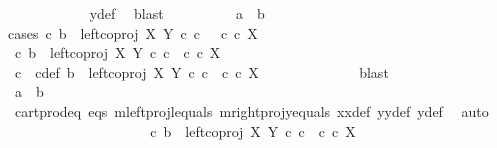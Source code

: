 \begin{isabellebody}
\ \ \ \ \ \ \ \ \ \ \isamarkupfalse%
\ y{\isacharunderscore}{\kern0pt}def\ \isamarkupfalse%
\ blast\isanewline
\ \ \ \ \ \ \ \ \isamarkupfalse%
\ {\isachardoublequoteopen}a\ {\isacharequal}{\kern0pt}\ b{\isachardoublequoteclose}\isanewline
\ \ \ \ \ \ \ \ \isamarkupfalse%
{\isacharparenleft}{\kern0pt}cases\ {\isachardoublequoteopen}{\isasymexists}c{\isachardot}{\kern0pt}\ b\ {\isacharequal}{\kern0pt}\ left{\isacharunderscore}{\kern0pt}coproj\ X\ Y\ {\isasymcirc}\isactrlsub c\ c\ \ {\isasymand}\ c\ {\isasymin}\isactrlsub c\ X{\isachardoublequoteclose}{\isacharparenright}{\kern0pt}\isanewline
\ \ \ \ \ \ \ \ \ \ \isamarkupfalse%
\ {\isachardoublequoteopen}{\isasymexists}c{\isachardot}{\kern0pt}\ b\ {\isacharequal}{\kern0pt}\ left{\isacharunderscore}{\kern0pt}coproj\ X\ Y\ {\isasymcirc}\isactrlsub c\ c\ {\isasymand}\ c\ {\isasymin}\isactrlsub c\ X{\isachardoublequoteclose}\isanewline
\ \ \ \ \ \ \ \ \ \ \isamarkupfalse%
\ \isamarkupfalse%
\ c\ \ c{\isacharunderscore}{\kern0pt}def{\isacharcolon}{\kern0pt}\ {\isachardoublequoteopen}b\ {\isacharequal}{\kern0pt}\ left{\isacharunderscore}{\kern0pt}coproj\ X\ Y\ {\isasymcirc}\isactrlsub c\ c\ {\isasymand}\ c\ {\isasymin}\isactrlsub c\ X{\isachardoublequoteclose}\isanewline
\ \ \ \ \ \ \ \ \ \ \ \ \isamarkupfalse%
\ blast\isanewline
\ \ \ \ \ \ \ \ \ \ \isamarkupfalse%
\ \isamarkupfalse%
\ {\isachardoublequoteopen}a\ {\isacharequal}{\kern0pt}\ b{\isachardoublequoteclose}\isanewline
\ \ \ \ \ \ \ \ \ \ \ \ \isamarkupfalse%
\ cart{\isacharunderscore}{\kern0pt}prod{\isacharunderscore}{\kern0pt}eq{}\ eqs\ m{\isacharunderscore}{\kern0pt}leftproj{\isacharunderscore}{\kern0pt}l{\isacharunderscore}{\kern0pt}equals\ m{\isacharunderscore}{\kern0pt}rightproj{\isacharunderscore}{\kern0pt}y{\isacharunderscore}{\kern0pt}equals\ x{}x{}{\isacharunderscore}{\kern0pt}def{\isacharparenleft}{\kern0pt}{}{\isacharparenright}{\kern0pt}\ y{}y{}{\isacharunderscore}{\kern0pt}def\ y{\isacharunderscore}{\kern0pt}def\ \isamarkupfalse%
\ auto\isanewline
\ \ \ \ \ \ \ \ \isamarkupfalse%
\isanewline
\ \ \ \ \ \ \ \ \ \ \isamarkupfalse%
\ {\isachardoublequoteopen}{\isasymnexists}c{\isachardot}{\kern0pt}\ b\ {\isacharequal}{\kern0pt}\ left{\isacharunderscore}{\kern0pt}coproj\ X\ Y\ {\isasymcirc}\isactrlsub c\ c\ {\isasymand}\ c\ {\isasymin}\isactrlsub c\ X{\isachardoublequoteclose}\isanewline

\end{isabellebody}
